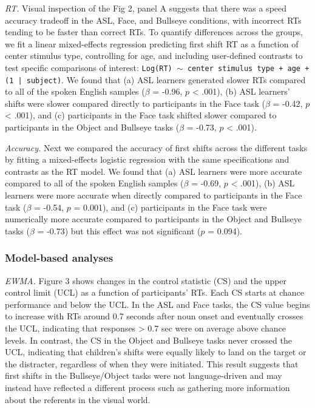 \documentclass[10pt, letterpaper]{article}
\begin{document}
\emph{RT.} Visual inspection of the Fig 2, panel A suggests that there
was a speed accuracy tradeoff in the ASL, Face, and Bullseye conditions,
with incorrect RTs tending to be faster than correct RTs. To quantify
differences across the groups, we fit a linear mixed-effects regression
predicting first shift RT as a function of center stimulus type,
controlling for age, and including user-defined contrasts to test
specific comparisons of interest:
\texttt{Log(RT) $\sim$ center stimulus type + age +  (1 | subject)}. We
found that (a) ASL learners generated slower RTs compared to all of the
spoken English samples (\(\beta\) = -0.96, \(p\) \textless{} .001), (b)
ASL learners' shifts were slower compared directly to participants in
the Face task (\(\beta\) = -0.42, \(p\) \textless{} .001), and (c)
participants in the Face task shifted slower compared to participants in
the Object and Bullseye tasks (\(\beta\) = -0.73, \(p\) \textless{}
.001).

\emph{Accuracy.} Next we compared the accuracy of first shifts across
the different tasks by fitting a mixed-effects logistic regression with
the same specifications and contrasts as the RT model. We found that (a)
ASL learners were more accurate compared to all of the spoken English
samples (\(\beta\) = -0.69, \(p\) \textless{} .001), (b) ASL learners
were more accurate when directly compared to participants in the Face
task (\(\beta\) = -0.54, \(p\) = 0.001), and (c) participants in the
Face task were numerically more accurate compared to participants in the
Object and Bullseye tasks (\(\beta\) = -0.73) but this effect was not
significant (\(p\) = 0.094).

\subsubsection{Model-based analyses}\label{model-based-analyses}

\emph{EWMA.} Figure 3 shows changes in the control statistic (CS) and
the upper control limit (UCL) as a function of participants' RTs. Each
CS starts at chance performance and below the UCL. In the ASL and Face
tasks, the CS value begins to increase with RTs around 0.7 seconds after
noun onset and eventually crosses the UCL, indicating that responses
\textgreater{} 0.7 sec were on average above chance levels. In contrast,
the CS in the Object and Bullseye tasks never crossed the UCL,
indicating that children's shifts were equally likely to land on the
target or the distracter, regardless of when they were initiated. This
result suggests that first shifts in the Bullseye/Object tasks were not
language-driven and may instead have reflected a different process such
as gathering more information about the referents in the visual world.
\end{document}
